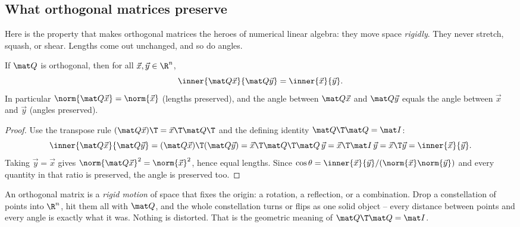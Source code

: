 \subsection{What orthogonal matrices preserve}

Here is the property that makes orthogonal matrices the heroes of numerical linear algebra: they
move space \emph{rigidly}. They never stretch, squash, or shear. Lengths come out unchanged, and so
do angles.

\begin{theorem}\label{ch17:Q-preserves}
If $\mat Q$ is orthogonal, then for all $\vec x,\vec y\in\R^n$,
\[
  \inner{\mat Q\vec x}{\mat Q\vec y} = \inner{\vec x}{\vec y}.
\]
In particular $\norm{\mat Q\vec x}=\norm{\vec x}$ (lengths preserved), and the angle between
$\mat Q\vec x$ and $\mat Q\vec y$ equals the angle between $\vec x$ and $\vec y$ (angles preserved).
\end{theorem}

\begin{proof}
Use the transpose rule $(\mat Q\vec x)\T=\vec x\T\mat Q\T$ and the defining identity
$\mat Q\T\mat Q=\mat I$:
\[
  \inner{\mat Q\vec x}{\mat Q\vec y}
  = (\mat Q\vec x)\T(\mat Q\vec y)
  = \vec x\T \mat Q\T\mat Q\,\vec y
  = \vec x\T\mat I\,\vec y
  = \vec x\T\vec y
  = \inner{\vec x}{\vec y}.
\]
Taking $\vec y=\vec x$ gives $\norm{\mat Q\vec x}^2=\norm{\vec x}^2$, hence equal lengths. Since
$\cos\theta=\inner{\vec x}{\vec y}/(\norm{\vec x}\norm{\vec y})$ and every quantity in that ratio is
preserved, the angle is preserved too.
\end{proof}

\begin{intuitionbox}
An orthogonal matrix is a \emph{rigid motion} of space that fixes the origin: a rotation, a
reflection, or a combination. Drop a constellation of points into $\R^n$, hit them all with
$\mat Q$, and the whole constellation turns or flips as one solid object -- every distance between
points and every angle is exactly what it was. Nothing is distorted. That is the geometric meaning
of $\mat Q\T\mat Q=\mat I$.
\end{intuitionbox}

